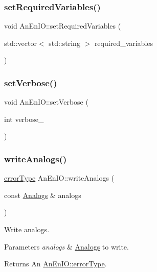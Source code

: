 \subsubsection{\texorpdfstring{set\+Required\+Variables()}{setRequiredVariables()}}
{\footnotesize\ttfamily void An\+En\+I\+O\+::set\+Required\+Variables (\begin{DoxyParamCaption}\item[{std\+::vector$<$ std\+::string $>$}]{required\+\_\+variables }\end{DoxyParamCaption})}

\mbox{\label{class_an_en_i_o_a696dff7bb250fc45b597e5f82e33e23e}} 
\subsubsection{\texorpdfstring{set\+Verbose()}{setVerbose()}}
{\footnotesize\ttfamily void An\+En\+I\+O\+::set\+Verbose (\begin{DoxyParamCaption}\item[{int}]{verbose\+\_\+ }\end{DoxyParamCaption})}

\mbox{\label{class_an_en_i_o_a0a6326b1fe67f23b81667af12a99a5f0}} 
\subsubsection{\texorpdfstring{write\+Analogs()}{writeAnalogs()}}
{\footnotesize\ttfamily \mbox{\hyperlink{class_an_en_i_o_aa56bc1ec6610b86db4349bce20f9ead0}{error\+Type}} An\+En\+I\+O\+::write\+Analogs (\begin{DoxyParamCaption}\item[{const \mbox{\hyperlink{class_analogs}{Analogs}} \&}]{analogs }\end{DoxyParamCaption})}

Write analogs. 
\begin{DoxyParams}{Parameters}
{\em analogs} & \mbox{\hyperlink{class_analogs}{Analogs}} to write. \\
\hline
\end{DoxyParams}
\begin{DoxyReturn}{Returns}
An \mbox{\hyperlink{class_an_en_i_o_aa56bc1ec6610b86db4349bce20f9ead0}{An\+En\+I\+O\+::error\+Type}}. 
\end{DoxyReturn}
\mbox{\label{class_an_en_i_o_a150e3fc6fe249b11bac909e5ee843a58}} 
